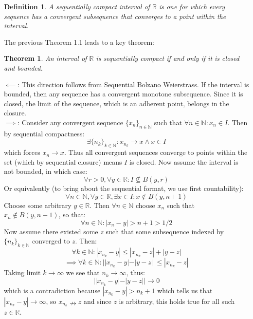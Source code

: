 \documentclass[10pt,letterpaper]{article} %
\newtheorem{thm}{Theorem}[section]
\newtheorem{defn}{Definition}[section]
\begin{document}
\begin{defn}
A sequentially compact interval of $\mathbb{R}$ is one for which every sequence has a convergent subsequence that converges to a point within the interval. 
\end{defn}
The previous Theorem 1.1 leads to a key theorem:
\begin{thm}
An interval of $\mathbb{R}$ is sequentially compact if and only if it is closed and bounded. 
\end{thm}
$\impliedby$: This direction follows from Sequential Bolzano Weierstrass. If the interval is bounded, then any sequence has a convergent monotone subsequence. Since it is closed, the limit of the sequence, which is an adherent point, belongs in the closure.\\

$\implies$: Consider any convergent sequence $\{x_n\}_{n \in \mathbb{N}}$ such that $\forall n \in \mathbb{N}: x_n \in I$. Then by sequential compactness:
\begin{equation*}
\exists \{n_k\}_{k \in \mathbb{N}}: x_{n_k} \xrightarrow{} x \land x \in I
\end{equation*}
which forces $x_n \xrightarrow{} x$. Thus all convergent sequences converge to points within the set (which by sequential closure) means $I$ is closed. Now assume the interval is not bounded, in which case:
\begin{equation*}
\forall r > 0, \forall y \in \mathbb{R}: I \nsubseteq B(y, r)
\end{equation*}
Or equivalently (to bring about the sequential format, we use first countability):
\begin{equation*}
\forall n \in \mathbb{N}, \forall y \in \mathbb{R}, \exists x \in I: x \notin B(y, n+1)
\end{equation*}
Choose some arbitrary $y \in \mathbb{R}$. Then $\forall n \in \mathbb{N}$ choose $x_n$ such that $x_n \notin B(y, n+1)$, so that:
\begin{equation*}
\forall n \in \mathbb{N}: |x_n - y| > n+1 > 1/2
\end{equation*}
Now assume there existed some $z$ such that some subsequence indexed by $\{n_k\}_{k \in \mathbb{N}}$ converged to $z$. Then:
\begin{equation*}
\forall k \in \mathbb{N}: |x_{n_k} - y| \leqslant |x_{n_k} - z| + |y-z|
\end{equation*}
\begin{equation*}
\implies \forall k \in \mathbb{N}: ||x_{n_k} - y| - |y-z|| \leqslant |x_{n_k} - z|
\end{equation*}
Taking limit $k \xrightarrow{} \infty$ we see that $n_k \xrightarrow{} \infty$, thus:
\begin{equation*}
||x_{n_k} - y| - |y-z|| \xrightarrow{} 0
\end{equation*}
which is a contradiction because $|x_{n_k} - y| > n_k + 1$ which tells us that $|x_{n_k} - y| \xrightarrow{} \infty$, so $x_{n_k} \nrightarrow z$ and since $z$ is arbitrary, this holds true for all such $z \in \mathbb{R}$. 
\end{document}
